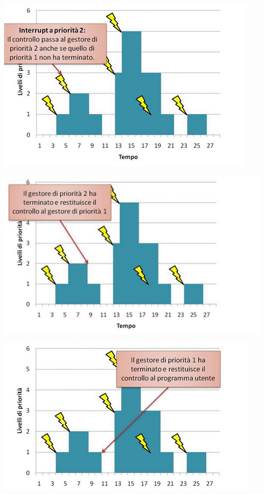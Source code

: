 \documentclass[a4paper,12pt, oneside]{book}
\begin{document}
\begin{center}
  \includegraphics[scale = 0.6]{img/int3.png}
\end{center}
\begin{center}
  \includegraphics[scale = 0.6]{img/iny4.png}
\end{center}
\begin{center}
  \includegraphics[scale = 0.6]{img/int5.png}
\end{center}
\end{document}
